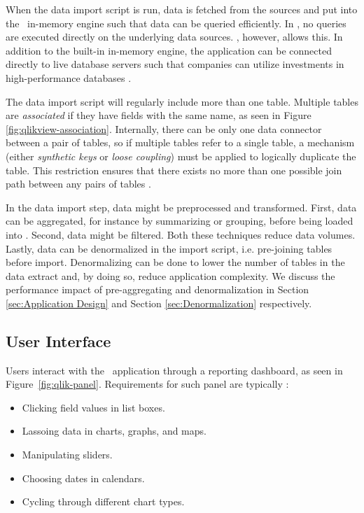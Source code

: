 When the data import script is run, data is fetched from the sources and put into the \qlikview~in-memory engine such that data can be queried efficiently. In \qlikview, no queries are executed directly on the underlying data sources. \tableau, however, allows this. In addition to the built-in in-memory engine, the application can be connected directly to live database servers such that companies can utilize investments in high-performance databases \cite{Kamkolkar2015-iq}.



The data import script will regularly include more than one table. Multiple tables are \textit{associated} if they have fields with the same name, as seen in Figure \ref{fig:qlikview-association}. Internally, there can be only one data connector between a pair of tables, so if multiple tables refer to a single table, a mechanism (either \textit{synthetic keys} or \textit{loose coupling}) must be applied to logically duplicate the table. This restriction ensures that there exists no more than one possible join path between any pairs of tables \cite{noauthor_undated-js}.

In the data import step, data might be preprocessed and transformed. First, data can be aggregated, for instance by summarizing or grouping, before being loaded into \qlikview. Second, data might be filtered. Both these techniques reduce data volumes. Lastly, data can be denormalized in the import script, i.e. pre-joining tables before import. Denormalizing can be done to lower the number of tables in the data extract and, by doing so, reduce application complexity. We discuss the performance impact of pre-aggregating and denormalization in Section \ref{sec:Application Design} and Section \ref{sec:Denormalization} respectively.

\subsection{User Interface}
\label{sub:User Interface}
Users interact with the \bd~application through a reporting dashboard, as seen in Figure~\ref{fig:qlik-panel}. Requirements for such panel are typically \cite{Qlik2014-vd}:
\begin{itemize}
  \item Clicking field values in list boxes.
  \item Lassoing data in charts, graphs, and maps.
  \item Manipulating sliders.
  \item Choosing dates in calendars.
  \item Cycling through different chart types.
\end{itemize}

